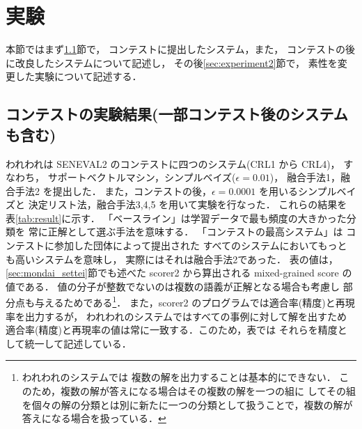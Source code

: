 \section{実験}
\label{sec:experiment}

本節ではまず\ref{sec:experiment1}節で，
コンテストに提出したシステム，また，
コンテストの後に改良したシステムについて記述し，
その後\ref{sec:experiment2}節で，
素性を変更した実験について記述する．

\subsection{コンテストの実験結果(一部コンテスト後のシステムも含む)}
\label{sec:experiment1}

われわれは SENEVAL2 のコンテストに四つのシステム(CRL1 から CRL4)，
すなわち，
サポートベクトルマシン，シンプルベイズ($\epsilon=0.01$)，
融合手法1，融合手法2 を提出した．
また，コンテストの後，$\epsilon=0.0001$ を用いるシンプルベイズと
決定リスト法，融合手法3,4,5 を用いて実験を行なった．
これらの結果を表\ref{tab:result}に示す．
「ベースライン」は学習データで最も頻度の大きかった分類を
常に正解として選ぶ手法を意味する．
「コンテストの最高システム」は
コンテストに参加した団体によって提出された
すべてのシステムにおいてもっとも高いシステムを意味し，
実際にはそれは融合手法2であった．
表の値は，\ref{sec:mondai_settei}節でも述べた
scorer2 から算出される
mixed-grained score の値である．
値の分子が整数でないのは複数の語義が正解となる場合も考慮し
部分点も与えるためである\footnote{われわれのシステムでは
複数の解を出力することは基本的にできない．
このため，複数の解が答えになる場合はその複数の解を一つの組に
してその組を個々の解の分類とは別に新たに一つの分類として扱うことで，複数の解が答えになる場合を扱っている．}．
また，scorer2 のプログラムでは適合率(精度)と再現率を出力するが，
われわれのシステムではすべての事例に対して解を出すため
適合率(精度)と再現率の値は常に一致する．このため，表では
それらを精度として統一して記述している．



